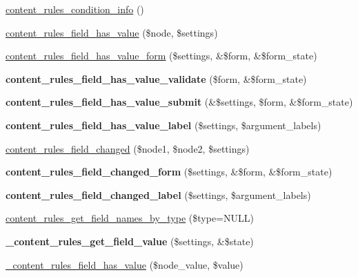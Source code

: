 \begin{CompactItemize}
\item 
\hyperlink{content_8rules_8inc_59bc67309daeaf3bd2763232a3647d22}{content\_\-rules\_\-condition\_\-info} ()
\item 
\hyperlink{content_8rules_8inc_f053a4e6221e3533fcb4b5532ecb0279}{content\_\-rules\_\-field\_\-has\_\-value} (\$node, \$settings)
\item 
\hyperlink{content_8rules_8inc_58473b6706e8edcb5bac658874c20ea4}{content\_\-rules\_\-field\_\-has\_\-value\_\-form} (\$settings, \&\$form, \&\$form\_\-state)
\item 
\hypertarget{content_8rules_8inc_9c34e533252d1787ebf447e63da10471}{
\textbf{content\_\-rules\_\-field\_\-has\_\-value\_\-validate} (\$form, \&\$form\_\-state)}
\label{content_8rules_8inc_9c34e533252d1787ebf447e63da10471}

\item 
\hypertarget{content_8rules_8inc_5f799052253c9d25e128e7664d5f5a0f}{
\textbf{content\_\-rules\_\-field\_\-has\_\-value\_\-submit} (\&\$settings, \$form, \&\$form\_\-state)}
\label{content_8rules_8inc_5f799052253c9d25e128e7664d5f5a0f}

\item 
\hypertarget{content_8rules_8inc_b33a0e4beeaa5130c179165194617918}{
\textbf{content\_\-rules\_\-field\_\-has\_\-value\_\-label} (\$settings, \$argument\_\-labels)}
\label{content_8rules_8inc_b33a0e4beeaa5130c179165194617918}

\item 
\hyperlink{content_8rules_8inc_f20c9f43c6c5897cf3eaa4c6e46a06d9}{content\_\-rules\_\-field\_\-changed} (\$node1, \$node2, \$settings)
\item 
\hypertarget{content_8rules_8inc_f09b1a23d841602b9191ebfbf103a290}{
\textbf{content\_\-rules\_\-field\_\-changed\_\-form} (\$settings, \&\$form, \&\$form\_\-state)}
\label{content_8rules_8inc_f09b1a23d841602b9191ebfbf103a290}

\item 
\hypertarget{content_8rules_8inc_95a2862c6f0641bca2b2f215b88877a9}{
\textbf{content\_\-rules\_\-field\_\-changed\_\-label} (\$settings, \$argument\_\-labels)}
\label{content_8rules_8inc_95a2862c6f0641bca2b2f215b88877a9}

\item 
\hyperlink{content_8rules_8inc_dc04222eaffae3195a9ab13595df730f}{content\_\-rules\_\-get\_\-field\_\-names\_\-by\_\-type} (\$type=NULL)
\item 
\hypertarget{content_8rules_8inc_312bf4a228e45933028cd6ddea56de1d}{
\textbf{\_\-content\_\-rules\_\-get\_\-field\_\-value} (\$settings, \&\$state)}
\label{content_8rules_8inc_312bf4a228e45933028cd6ddea56de1d}

\item 
\hyperlink{content_8rules_8inc_1ba49a82564e33db3f3538ceaf7c1f69}{\_\-content\_\-rules\_\-field\_\-has\_\-value} (\$node\_\-value, \$value)
\end{CompactItemize}



